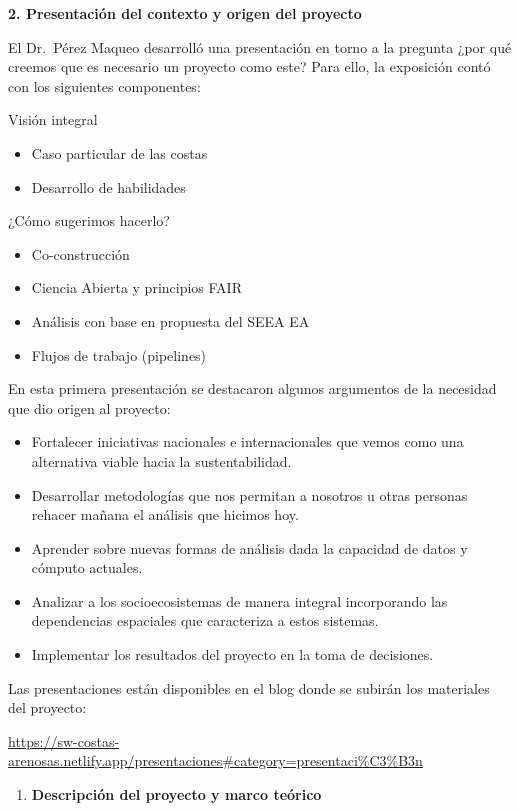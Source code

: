 \documentclass[
  letterpaper,
  DIV=11,
  numbers=noendperiod]{scrreprt}
\providecommand{\tightlist}{%
  \setlength{\itemsep}{0pt}\setlength{\parskip}{0pt}}\usepackage{longtable,booktabs,array}
\begin{document}
\textbf{2. Presentación del contexto y origen del proyecto}

El Dr.~Pérez Maqueo desarrolló una presentación en torno a la pregunta
¿por qué creemos que es necesario un proyecto como este? Para ello, la
exposición contó con los siguientes componentes:

Visión integral

\begin{itemize}
\item
  Caso particular de las costas
\item
  Desarrollo de habilidades
\end{itemize}

¿Cómo sugerimos hacerlo?

\begin{itemize}
\item
  Co-construcción
\item
  Ciencia Abierta y principios FAIR
\item
  Análisis con base en propuesta del SEEA EA
\item
  Flujos de trabajo (pipelines)
\end{itemize}

En esta primera presentación se destacaron algunos argumentos de la
necesidad que dio origen al proyecto:

\begin{itemize}
\item
  Fortalecer iniciativas nacionales e internacionales que vemos como una
  alternativa viable hacia la sustentabilidad.
\item
  Desarrollar metodologías que nos permitan a nosotros u otras personas
  rehacer mañana el análisis que hicimos hoy.
\item
  Aprender sobre nuevas formas de análisis dada la capacidad de datos y
  cómputo actuales.
\item
  Analizar a los socioecosistemas de manera integral incorporando las
  dependencias espaciales que caracteriza a estos sistemas.
\item
  Implementar los resultados del proyecto en la toma de decisiones.
\end{itemize}

Las presentaciones están disponibles en el blog donde se subirán los
materiales del proyecto:~

\url{https://sw-costas-arenosas.netlify.app/presentaciones\#category=presentaci\%C3\%B3n}

\begin{enumerate}
\def\labelenumi{\arabic{enumi}.}
\setcounter{enumi}{2}
\tightlist
\item
  \textbf{Descripción del proyecto y marco teórico}
\end{enumerate}
\end{document}
